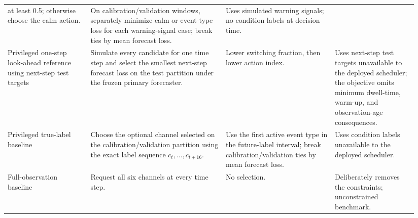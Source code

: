 \begin{table}[H]
\begin{tabular}{@{}p{0.19\linewidth}p{0.31\linewidth}p{0.25\linewidth}p{0.19\linewidth}@{}}
        at least 0.5; otherwise choose the calm action.
      & On calibration/validation windows, separately minimize calm or event-type loss for
        each warning-signal case; break ties by mean forecast loss.
      & Uses simulated warning signals; no condition labels at decision time. \\
    Privileged one-step look-ahead reference using next-step test targets
      & Simulate every candidate for one time step and select the smallest next-step
        forecast loss on the test partition under the frozen primary forecaster.
      & Lower switching fraction, then lower action index.
      & Uses next-step test targets unavailable to the deployed scheduler; the objective omits minimum dwell-time, warm-up, and observation-age consequences. \\
    Privileged true-label baseline
      & Choose the optional channel selected on the calibration/validation partition using the exact
        label sequence $c_t,\ldots,c_{t+16}$.
      & Use the first active event type in the future-label interval; break calibration/validation
        ties by mean forecast loss.
      & Uses condition labels unavailable to the deployed scheduler. \\
    Full-observation baseline
      & Request all six channels at every time step.
      & No selection.
      & Deliberately removes the constraints; unconstrained benchmark. \\
    \bottomrule
  \end{tabular}
\end{table}
